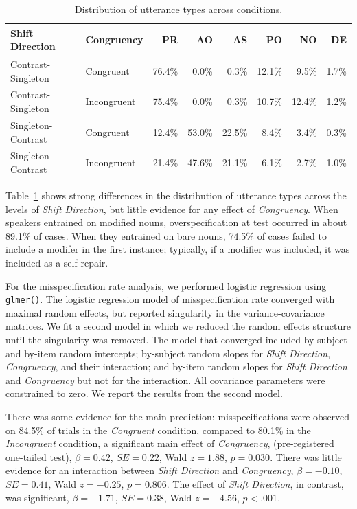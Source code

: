 \documentclass[natbib,man,a4paper]{apa6}
\begin{document}
\begin{table}[ht]
\centering
\caption{Distribution of utterance types across conditions.} 
\label{tbl:exp2-utt-dist}
\begin{tabular}{llrrrrrr}
  \hline
Shift Direction & Congruency & PR & AO & AS & PO & NO & DE \\ 
  \hline
Contrast-Singleton & Congruent & 76.4\% & 0.0\% & 0.3\% & 12.1\% & 9.5\% & 1.7\% \\ 
  Contrast-Singleton & Incongruent & 75.4\% & 0.0\% & 0.3\% & 10.7\% & 12.4\% & 1.2\% \\ 
  Singleton-Contrast & Congruent & 12.4\% & 53.0\% & 22.5\% & 8.4\% & 3.4\% & 0.3\% \\ 
  Singleton-Contrast & Incongruent & 21.4\% & 47.6\% & 21.1\% & 6.1\% & 2.7\% & 1.0\% \\ 
   \hline
\end{tabular}
\end{table}

Table~\ref{tbl:exp2-utt-dist} shows strong differences in the distribution of utterance types across the levels of \emph{Shift Direction}, but little evidence for any effect of \emph{Congruency}.  When speakers entrained on modified nouns, overspecification at test occurred in about
89.1\%  
of cases. When they entrained on bare nouns, 
74.5\%
of cases failed to include a modifer in the first instance; typically, if a modifier was included, it was included as a self-repair.

For the misspecification rate analysis, we performed logistic regression using \texttt{glmer()}.  The logistic regression model of misspecification rate converged with maximal random effects, but reported singularity in the variance-covariance matrices. We fit a second model in which we reduced the random effects structure until the singularity was removed. The model that converged included by-subject and by-item random intercepts; by-subject random slopes for \emph{Shift Direction}, \emph{Congruency}, and their interaction; and by-item random slopes for \emph{Shift Direction} and \emph{Congruency} but not for the interaction. All covariance parameters were constrained to zero.  We report the results from the second model.

There was some evidence for the main prediction: misspecifications were observed on 
84.5\%
of trials in the \emph{Congruent} condition, compared to 
80.1\%
in the \emph{Incongruent} condition, a significant main effect of \emph{Congruency}, (pre-registered one-tailed test), 
\(\beta = 0.42\), \(SE = 0.22\), Wald \(z = 1.88\), \(p = 0.030\).
There was little evidence for an interaction between \emph{Shift Direction} and \emph{Congruency}, 
\(\beta = -0.10\), \(SE = 0.41\), Wald \(z = -0.25\), \(p = 0.806\).
The effect of \emph{Shift Direction}, in contrast, was significant,
\(\beta = -1.71\), \(SE = 0.38\), Wald \(z = -4.56\), \(p < .001\).
\end{document}
